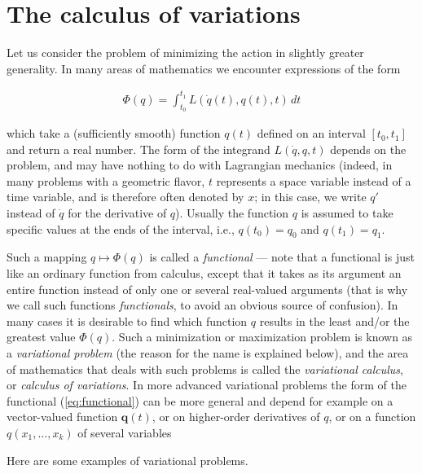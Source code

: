 \documentclass[11pt]{report}
\theoremstyle{plain}
\theoremstyle{definition}
\begin{document}
\section{The calculus of variations}
\label{sec:variational-calculus}
Let us consider the problem of minimizing the action
in slightly greater generality. In many areas of
mathematics we encounter expressions of the form

\begin{equation*} \tag{14}\label{eq:functional}
\begin{split}
\Phi(q) = \int_{t_0}^{t_1} L(\dot{q}(t),q(t),t)\,dt
\end{split}
\end{equation*}

which take a (sufficiently smooth) function $q(t)$
defined on an interval $[t_0,t_1]$ and return a real
number. The form of the integrand $L(\dot{q},q,t)$
depends on the problem, and may have nothing to do
with Lagrangian mechanics (indeed, in many problems
with a geometric flavor, $t$ represents a space
variable instead of a time variable, and is therefore
often denoted by $x$; in this case, we write $q'$
instead of $\dot{q}$ for the derivative of $q$).
Usually the function $q$ is assumed to take specific
values at the ends of the interval, i.e., $q(t_0)=q_0$
and $q(t_1)=q_1$.

Such a mapping $q\mapsto \Phi(q)$ is called a
\emph{functional} --- note that a functional is just like
an ordinary function from calculus, except that it
takes as its argument an entire function instead of
only one or several real-valued arguments (that is why
we call such functions \emph{functionals}, to avoid an
obvious source of confusion). In many cases it is
desirable to find which function $q$ results in the
least and/or the greatest value $\Phi(q)$. Such a
minimization or maximization problem is known as a
\emph{variational problem} (the reason for the name is
explained below), and the area of mathematics that
deals with such problems is called the \emph{variational
calculus}, or \emph{calculus of variations}. In more
advanced variational problems the form of the
functional (\ref{eq:functional}) can be more general and
depend for example on a vector-valued function
$\mathbf{q}(t)$, or on higher-order derivatives of
$q$, or on a function $q(x_1,\ldots,x_k)$ of several
variables

Here are some examples of variational problems.
\end{document}
